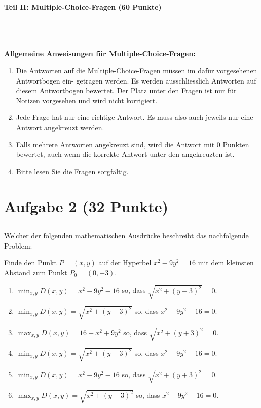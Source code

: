 \begin{Large}
\textbf{Teil II: Multiple-Choice-Fragen (60 Punkte)}
\end{Large}
\\
\\
\\
\textbf{Allgemeine Anweisungen für Multiple-Choice-Fragen:}
\\
\renewcommand{\labelenumi}{(\roman{enumi})}
\begin{enumerate}
\item
Die Antworten auf die Multiple-Choice-Fragen müssen im dafür vorgesehenen Antwortbogen ein-
getragen werden. Es werden ausschliesslich Antworten auf diesem Antwortbogen bewertet. Der
Platz unter den Fragen ist nur für Notizen vorgesehen und wird nicht korrigiert.

\item
Jede Frage hat nur eine richtige Antwort. Es muss also auch jeweils nur eine Antwort angekreuzt
werden.

\item
Falls mehrere Antworten angekreuzt sind, wird die Antwort mit 0 Punkten bewertet, auch wenn
die korrekte Antwort unter den angekreuzten ist.

\item
Bitte lesen Sie die Fragen sorgfältig.

\end{enumerate}
\newpage
\section*{Aufgabe 2 (32 Punkte)}
\vspace{0.4cm}
\subsection*{}
Welcher der folgenden mathematischen Ausdrücke beschreibt das nachfolgende Problem:
\begin{displayquote}
	Finde den Punkt $P = (x,y)$ auf der Hyperbel $x^2 - 9 y^2 = 16$ mit dem kleinsten
	Abstand zum Punkt $P_0 = (0,-3)$.
\end{displayquote}
 \renewcommand{\labelenumi}{(\alph{enumi})}
\begin{enumerate}
\item 
$\min_{x,y} D(x,y) = x^2 - 9y^2 - 16$ so, dass
$\sqrt{x^2 + (y-3)^2} = 0$.
\item 
$\min_{x,y} D(x,y) = \sqrt{x^2 + ( y + 3)^2}$ so, dass
$x^2 - 9 y^2 - 16  = 0$.
\item 
$\max_{x,y} D(x,y) = 16 - x^2 + 9y^2 $ so, dass
$\sqrt{x^2 + (y+3)^2} = 0$.
\item 
$\min_{x,y} D(x,y) = \sqrt{x^2 + ( y - 3)^2}$ so, dass
$x^2 - 9 y^2 - 16  = 0$.
\item 
$\min_{x,y} D(x,y) = x^2 - 9y^2 - 16$ so, dass
$\sqrt{x^2 + (y+3)^2} = 0$.
\item
$\max_{x,y} D(x,y) = \sqrt{x^2 + ( y - 3)^2}$ so, dass
$x^2 - 9 y^2 - 16  = 0$.
\end{enumerate}
\ \\
